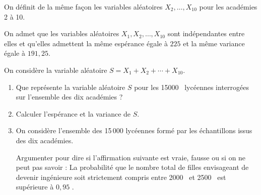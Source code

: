 \documentclass[10pt]{article}
\providecommand{\np}[2][]{{#2~#1}}
\begin{document}
On définit de la même façon les variables aléatoires $X_2, \dots, X_{10}$ pour les académies 2 à 10.

On admet que les variables aléatoires $X_1, X_2, \dots, X_{10}$ sont indépendantes entre elles et qu'elles admettent la même espérance égale à $225$ et la même variance égale à $191{,}25$.

On considère la variable aléatoire $S = X_1 + X_2 + \cdots + X_{10}$.

\medskip

\begin{enumerate}
\item Que représente la variable aléatoire $S$ pour les \np{15000} lycéennes interrogées sur l'ensemble des dix académies ?
\item Calculer l'espérance et la variance de $S$.
\item On considère l'ensemble des 15\,000 lycéennes formé par les échantillons issus des dix académies.

Argumenter pour dire si l'affirmation suivante est vraie, fausse ou si on ne peut pas savoir : \og La probabilité que le nombre total de filles envisageant de devenir ingénieure soit strictement compris entre \np{2000} et \np{2500} est supérieure à $0{,}95$ \fg.
\end{enumerate}

\bigskip
\end{document}
